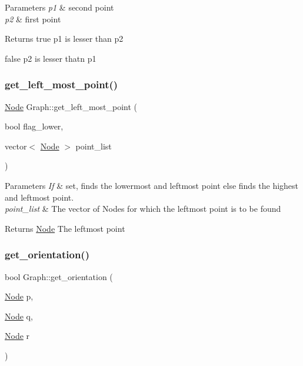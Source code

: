 \begin{DoxyParams}{Parameters}
{\em p1} & second point \\
\hline
{\em p2} & first point \\
\hline
\end{DoxyParams}
\begin{DoxyReturn}{Returns}
true p1 is lesser than p2 

false p2 is lesser thatn p1 
\end{DoxyReturn}
\mbox{\label{classGraph_af87a876de5bf77e8acc6c1e646c48472}} 
\subsubsection{\texorpdfstring{get\+\_\+left\+\_\+most\+\_\+point()}{get\_left\_most\_point()}}
{\footnotesize\ttfamily \hyperlink{classNode}{Node} Graph\+::get\+\_\+left\+\_\+most\+\_\+point (\begin{DoxyParamCaption}\item[{bool}]{flag\+\_\+lower,  }\item[{vector$<$ \hyperlink{classNode}{Node} $>$}]{point\+\_\+list }\end{DoxyParamCaption})}


\begin{DoxyParams}{Parameters}
{\em If} & set, finds the lowermost and leftmost point else finds the highest and leftmost point. \\
\hline
{\em point\+\_\+list} & The vector of Nodes for which the leftmost point is to be found \\
\hline
\end{DoxyParams}
\begin{DoxyReturn}{Returns}
\hyperlink{classNode}{Node} The leftmost point 
\end{DoxyReturn}
\mbox{\label{classGraph_a657f8174fb95bd7bfd99556cfb4cbd65}} 
\subsubsection{\texorpdfstring{get\+\_\+orientation()}{get\_orientation()}}
{\footnotesize\ttfamily bool Graph\+::get\+\_\+orientation (\begin{DoxyParamCaption}\item[{\hyperlink{classNode}{Node}}]{p,  }\item[{\hyperlink{classNode}{Node}}]{q,  }\item[{\hyperlink{classNode}{Node}}]{r }\end{DoxyParamCaption})}



